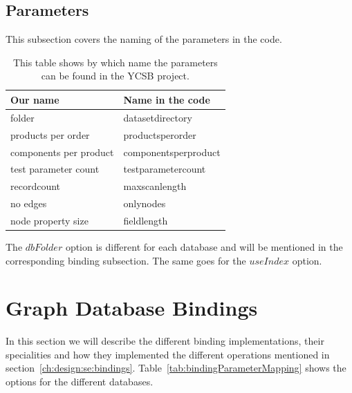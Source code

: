 \subsection{Parameters}
This subsection covers the naming of the parameters in the code.

\begin{table}[h!]
  \begin{minipage}{\textwidth}
    \begin{tabularx}{\textwidth}{ | X | X | }
      \hline
      Our name & Name in the code \\ \hline \hline
      folder & datasetdirectory \\ \hline
      products per order & productsperorder \\ \hline
      components per product & componentsperproduct \\ \hline
      test parameter count & testparametercount \\ \hline
      recordcount & maxscanlength \\ \hline
      no edges & onlynodes \\ \hline
      node property size & fieldlength \\ \hline
    \end{tabularx}
  \end{minipage}
  \caption{This table shows by which name the parameters can be found in the YCSB project.}
  \label{tab:parameterMapping}
\end{table}

The $ dbFolder $ option is different for each database and will be mentioned in the corresponding binding subsection.
The same goes for the $ useIndex $ option.

\section{Graph Database Bindings}
\label{ch:implementation:se:graphDatabaseBindings}
In this section we will describe the different binding implementations, their specialities and how they implemented the different operations mentioned in section~\ref{ch:design:se:bindings}.
Table~\ref{tab:bindingParameterMapping} shows the options for the different databases.

